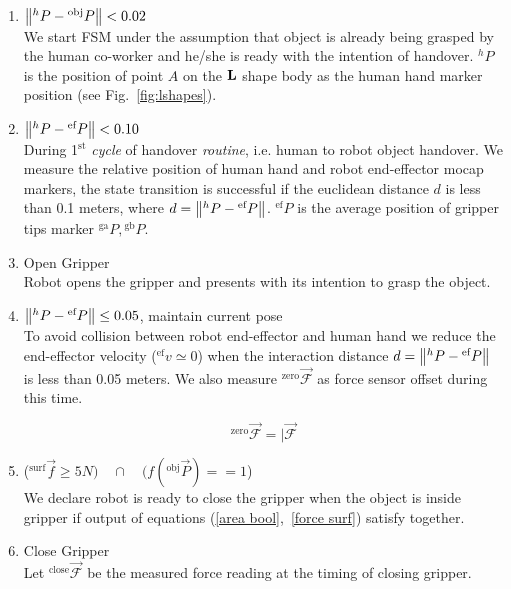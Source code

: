 \begin{enumerate}[start=0,label={\bf{t}\arabic*:}]

    \item $\norm{{}^h{P} - {}^\text{obj}{P}} < 0.02$\\
    We start FSM under the assumption that object is already being grasped by the human co-worker and he/she is ready with the intention of handover. ${}^h{P}$ is the position of point $A$ on the ${\bf L}$ shape body as the human hand marker position (see Fig.~\ref{fig:lshapes}).
    
    
    \item $\norm{{}^h{P} - {}^{\text{ef}}{P}} < 0.10$\\
	During 1$^\text{st}$ \textit{cycle} of handover \textit{routine}, i.e. human to robot object handover. We measure the relative position of human hand and robot end-effector mocap markers, the state transition is successful if the euclidean distance $d$ is less than 0.1 meters, where $d = \norm{{}^h{P} - {}^{\text{ef}}{P}}$. ${}^{\text{ef}}{P}$ is the average position of gripper tips marker ${}^\text{ga}P, {}^\text{gb}P$. 
    
    \item Open Gripper\\
    Robot opens the gripper and presents with its intention to grasp the object.
    
    \item $\norm{{}^h{P} - {}^{\text{ef}}{P}} \leq 0.05$, maintain current pose\\
    To avoid collision between robot end-effector and human hand we reduce the end-effector velocity (${}^{\text{ef}}v\simeq0$) when the interaction distance $d = \norm{{}^h{P} - {}^{\text{ef}}{P}}$ is less than 0.05 meters. We also measure ${}^\text{zero}\vec{\mathcal{F}}$ as force sensor offset during this time.

    \begin{equation}\label{Fzero}
        {}^\text{zero}\vec{\mathcal{F}} = \vert{\vec{\mathcal{F}}}
    \end{equation}

    \item (${}^\text{surf}\vec{f} \geq 5N) \quad \cap \quad (f({}^\text{obj}\vec{P})  == 1$)\\
    We declare robot is ready to close the gripper when the object is inside gripper if output of equations (\ref{area bool},~\ref{force surf}) satisfy together.
    
    \item Close Gripper\\
    Let ${}^\text{close}\vec{\mathcal{F}}$ be the measured force reading at the timing of closing gripper.
        

\end{enumerate}
